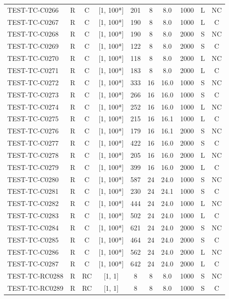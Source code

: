 \begin{longtable}{lccccccccc}
TEST-TC-C0266 & R & C & [1, 100*] & 201 & 8 & 8.0 & 1000 & L & NC \\
TEST-TC-C0267 & R & C & [1, 100*] & 190 & 8 & 8.0 & 1000 & L & C \\
TEST-TC-C0268 & R & C & [1, 100*] & 190 & 8 & 8.0 & 2000 & S & NC \\
TEST-TC-C0269 & R & C & [1, 100*] & 122 & 8 & 8.0 & 2000 & S & C \\
TEST-TC-C0270 & R & C & [1, 100*] & 118 & 8 & 8.0 & 2000 & L & NC \\
TEST-TC-C0271 & R & C & [1, 100*] & 183 & 8 & 8.0 & 2000 & L & C \\
TEST-TC-C0272 & R & C & [1, 100*] & 333 & 16 & 16.0 & 1000 & S & NC \\
TEST-TC-C0273 & R & C & [1, 100*] & 266 & 16 & 16.0 & 1000 & S & C \\
TEST-TC-C0274 & R & C & [1, 100*] & 252 & 16 & 16.0 & 1000 & L & NC \\
TEST-TC-C0275 & R & C & [1, 100*] & 215 & 16 & 16.1 & 1000 & L & C \\
TEST-TC-C0276 & R & C & [1, 100*] & 179 & 16 & 16.1 & 2000 & S & NC \\
TEST-TC-C0277 & R & C & [1, 100*] & 422 & 16 & 16.0 & 2000 & S & C \\
TEST-TC-C0278 & R & C & [1, 100*] & 205 & 16 & 16.0 & 2000 & L & NC \\
TEST-TC-C0279 & R & C & [1, 100*] & 399 & 16 & 16.0 & 2000 & L & C \\
TEST-TC-C0280 & R & C & [1, 100*] & 587 & 24 & 24.0 & 1000 & S & NC \\
TEST-TC-C0281 & R & C & [1, 100*] & 230 & 24 & 24.1 & 1000 & S & C \\
TEST-TC-C0282 & R & C & [1, 100*] & 444 & 24 & 24.0 & 1000 & L & NC \\
TEST-TC-C0283 & R & C & [1, 100*] & 502 & 24 & 24.0 & 1000 & L & C \\
TEST-TC-C0284 & R & C & [1, 100*] & 621 & 24 & 24.0 & 2000 & S & NC \\
TEST-TC-C0285 & R & C & [1, 100*] & 464 & 24 & 24.0 & 2000 & S & C \\
TEST-TC-C0286 & R & C & [1, 100*] & 562 & 24 & 24.0 & 2000 & L & NC \\
TEST-TC-C0287 & R & C & [1, 100*] & 642 & 24 & 24.0 & 2000 & L & C \\
TEST-TC-RC0288 & R & RC & [1, 1] & 8 & 8 & 8.0 & 1000 & S & NC \\
TEST-TC-RC0289 & R & RC & [1, 1] & 8 & 8 & 8.0 & 1000 & S & C \\

\end{longtable}
